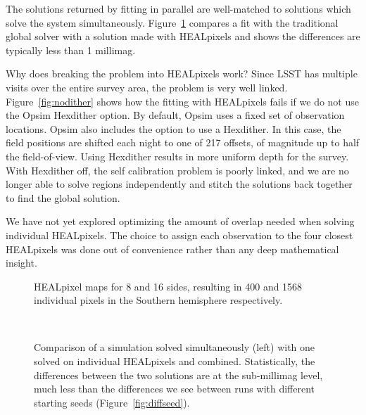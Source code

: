 \documentclass[12pt,preprint]{aastex}
\begin{document}
The solutions returned by fitting in parallel are well-matched to solutions which solve the system simultaneously.  Figure~\ref{fig:hpvglobal} compares a fit with the traditional global solver with a solution made with HEALpixels and shows the differences are typically less than 1 millimag.  





Why does breaking the problem into HEALpixels work?  Since LSST has multiple visits over the entire survey area, the problem is very well linked.  Figure~\ref{fig:nodither} shows how the fitting with HEALpixels fails if we do not use the Opsim Hexdither option.  By default, Opsim uses a fixed set of observation locations.  Opsim also includes the option to use a Hexdither.  In this case, the field positions are shifted each night to one of 217 offsets, of magnitude up to half the field-of-view.  Using Hexdither results in more uniform depth for the survey.  With Hexdither off, the self calibration problem is poorly linked, and we are no longer able to solve regions independently and stitch the solutions back together to find the global solution.  

We have not yet explored optimizing the amount of overlap needed when solving individual HEALpixels.   The choice to assign each observation to the four closest HEALpixels was done out of convenience rather than any deep mathematical insight.  


\begin{figure}
\caption{HEALpixel maps for 8 and 16 sides, resulting in 400 and 1568 individual pixels in the Southern hemisphere respectively.}
\end{figure}


\begin{figure}
 \\
\caption{Comparison of a simulation solved simultaneously (left) with one solved on individual HEALpixels and combined.  Statistically, the differences between the two solutions are at the sub-millimag level, much less than the differences we see between runs with different starting seeds (Figure~\ref{fig:diffseed}). \label{fig:hpvglobal}}
\end{figure}
\end{document}
